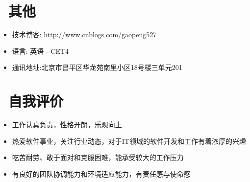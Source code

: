 \documentclass{resume}
\begin{document}
\section{\faInfo\ 其他}
\begin{itemize}[parsep=0.5ex]
  \item 技术博客: http://www.cnblogs.com/gaopeng527
  \item 语\hspace{2em}言: 英语 - CET4
  \item 通讯地址:北京市昌平区华龙苑南里小区18号楼三单元201
\end{itemize}

\section{\faTags\ 自我评价}
\begin{itemize}[parsep=0.5ex]
  \item 工作认真负责，性格开朗，乐观向上
  \item 热爱软件事业，关注行业动态，对于IT领域的软件开发和工作有着浓厚的兴趣
  \item 吃苦耐劳、敢于面对和克服困难，能承受较大的工作压力
  \item 有良好的团队协调能力和环境适应能力，有责任感与使命感
\end{itemize}

%
%
\end{document}
